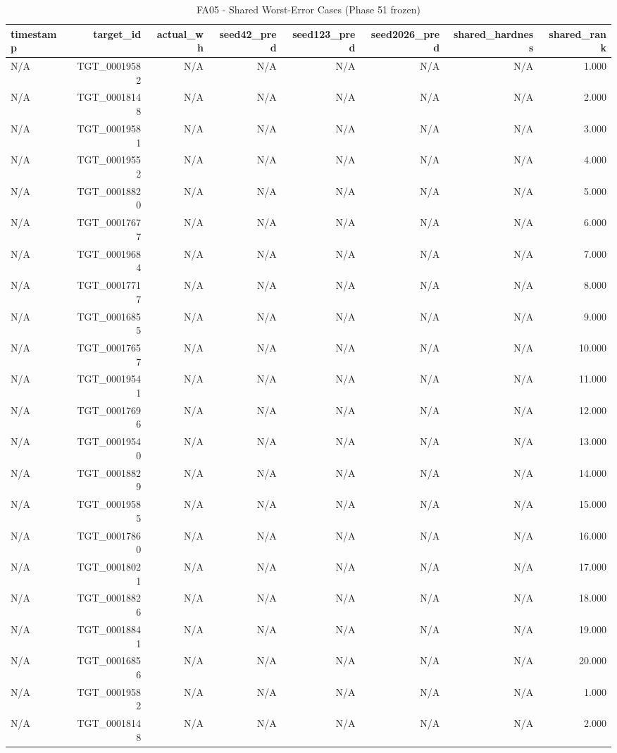 \begin{table}[h!]
\centering
\caption{FA05 - Shared Worst-Error Cases (Phase 51 frozen)}
\label{tab:fa05\_-\_shared\_worst-error\_cases\_(phase\_51\_frozen)}
\begin{tabular}{lrrrrrrr}
\toprule
timestamp & target\_id & actual\_wh & seed42\_pred & seed123\_pred & seed2026\_pred & shared\_hardness & shared\_rank \\
\midrule
N/A & TGT\_00019582 & N/A & N/A & N/A & N/A & N/A & 1.000 \\
N/A & TGT\_00018148 & N/A & N/A & N/A & N/A & N/A & 2.000 \\
N/A & TGT\_00019581 & N/A & N/A & N/A & N/A & N/A & 3.000 \\
N/A & TGT\_00019552 & N/A & N/A & N/A & N/A & N/A & 4.000 \\
N/A & TGT\_00018820 & N/A & N/A & N/A & N/A & N/A & 5.000 \\
N/A & TGT\_00017677 & N/A & N/A & N/A & N/A & N/A & 6.000 \\
N/A & TGT\_00019684 & N/A & N/A & N/A & N/A & N/A & 7.000 \\
N/A & TGT\_00017717 & N/A & N/A & N/A & N/A & N/A & 8.000 \\
N/A & TGT\_00016855 & N/A & N/A & N/A & N/A & N/A & 9.000 \\
N/A & TGT\_00017657 & N/A & N/A & N/A & N/A & N/A & 10.000 \\
N/A & TGT\_00019541 & N/A & N/A & N/A & N/A & N/A & 11.000 \\
N/A & TGT\_00017696 & N/A & N/A & N/A & N/A & N/A & 12.000 \\
N/A & TGT\_00019540 & N/A & N/A & N/A & N/A & N/A & 13.000 \\
N/A & TGT\_00018829 & N/A & N/A & N/A & N/A & N/A & 14.000 \\
N/A & TGT\_00019585 & N/A & N/A & N/A & N/A & N/A & 15.000 \\
N/A & TGT\_00017860 & N/A & N/A & N/A & N/A & N/A & 16.000 \\
N/A & TGT\_00018021 & N/A & N/A & N/A & N/A & N/A & 17.000 \\
N/A & TGT\_00018826 & N/A & N/A & N/A & N/A & N/A & 18.000 \\
N/A & TGT\_00018841 & N/A & N/A & N/A & N/A & N/A & 19.000 \\
N/A & TGT\_00016856 & N/A & N/A & N/A & N/A & N/A & 20.000 \\
N/A & TGT\_00019582 & N/A & N/A & N/A & N/A & N/A & 1.000 \\
N/A & TGT\_00018148 & N/A & N/A & N/A & N/A & N/A & 2.000 \\

\end{tabular}
\end{table}
